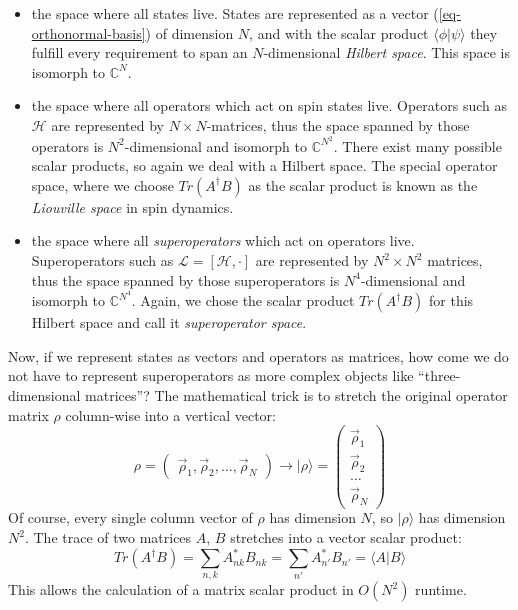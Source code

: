 \documentclass[11.5pt,a4paper]{article}
\begin{document}
\begin{itemize}
 \item the space where all states live. States are represented as a vector (\ref{eq-orthonormal-basis}) of dimension $N$, and with the scalar product $\langle \phi | \psi \rangle$ they fulfill every requirement to span an $N$-dimensional \emph{Hilbert space}. This space is isomorph to $\mathbb{C}^N$.
  \item the space where all operators which act on spin states live. Operators such as $\mathcal{H}$ are represented by $N\times N$-matrices, thus the space spanned by those operators is $N^2$-dimensional and isomorph to $\mathbb{C}^{N^2}$. There exist many possible scalar products, so again we deal with a Hilbert space. The special operator space, where we choose $Tr(A^\dagger B)$ as the scalar product is known as the \emph{Liouville space} in spin dynamics.
  \item the space where all \emph{superoperators} which act on operators live. Superoperators such as $\mathcal{L} = [\mathcal{H}, \cdot ]$ are represented by $N^2 \times N^2$ matrices, thus the space spanned by those superoperators is $N^4$-dimensional and isomorph to $\mathbb{C}^{N^4}$. Again, we chose the scalar product $Tr(A^\dagger B)$ for this Hilbert space and call it \emph{superoperator space}.
\end{itemize}

Now, if we represent states as vectors and operators as matrices, how come we do not have to represent superoperators as more complex objects like ``three-dimensional matrices''? The mathematical trick is to stretch the original operator matrix $\rho$ column-wise into a vertical vector:
\begin{equation}
 \rho = \begin{pmatrix} \vec{\rho}_1,\vec{\rho}_2,\ldots,\vec{\rho}_N \end{pmatrix} \rightarrow
  |\rho \rangle = \begin{pmatrix} \vec{\rho}_1 \\ \vec{\rho}_2 \\ \ldots \\ \vec{\rho}_N \end{pmatrix} 
\end{equation}
Of course, every single column vector of $\rho$ has dimension $N$, so $|\rho\rangle$ has dimension $N^2$. The trace of two matrices $A$, $B$ stretches into a vector scalar product:
\begin{equation}
 Tr( A^\dagger B ) = \sum_{n,k} A_{nk}^* B_{nk} = \sum_{n'} A_{n'}^* B_{n'} = \langle A | B \rangle
\end{equation}
This allows the calculation of a matrix scalar product in $O(N^2)$ runtime.
\end{document}
